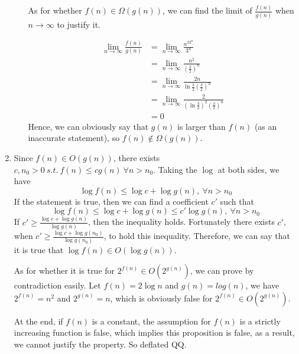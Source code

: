 \documentclass[a4paper,12pt]{article}
\begin{document}
\begin{enumerate}
\begin{enumerate}
{As for whether $f(n) \in \Omega (g(n))$, we can find the limit of $\frac{f(n)}{g(n)}$ when $n \rightarrow \infty $ to justify it.

\[
\begin{split}
\lim_{n \rightarrow \infty} \frac{f(n)}{g(n)} & = \lim_{n \rightarrow \infty} \frac{n^22^n}{3^n} \\
& = \lim_{n \rightarrow \infty} \frac{n^2}{(\frac{3}{2})^n} \\
& = \lim_{n \rightarrow \infty} \frac{2n}{\ln \frac{3}{2} (\frac{3}{2})^n} \\
& = \lim_{n \rightarrow \infty} \frac{2}{(\ln \frac{3}{2})^2 (\frac{3}{2})^n} \\
& = 0
\end{split}
\]
Hence, we can obviously say that $g(n)$ is larger than $f(n)$ (as an inaccurate statement), so $f(n) \notin \Omega (g(n))$.
    }
\end{enumerate}

\item{
Since $f(n) \in O(g(n))$, there exists $c,n_0>0 \ s.t. \ f(n) \leq cg(n) \ \forall n>n_0$. Taking the $\log$ at both sides, we have
\[
\log f(n) \leq \log c + \log g(n), \ \forall n>n_0
\]
If the statement is true, then we can find a coefficient $c'$ such that
\[
\log f(n) \leq \log c + \log g(n) \leq c' \log g(n), \ \forall n>n_0
\]
If $c' \geq \frac{\log c + \log g(n)}{\log g(n)}$, then the inequality holds. Fortunately there exists $c'$, when $c' \geq \frac{\log c + \log g(n_0)}{\log g(n_0)}$, to hold this inequality. Therefore, we can say that it is true that $\log f(n) \in O(\log g(n))$.

As for whether it is true for $2^{f(n)} \in O(2^{g(n)})$, we can prove by contradiction easily. Let $f(n) = 2\log n$ and $g(n) = log(n)$, we have $2^{f(n)}=n^2$ and $2^{g(n)} = n$, which is obviously false for $2^{f(n)} \in O(2^{g(n)})$.

At the end, if $f(n)$ is a constant, the assumption for $f(n)$ is a strictly increasing function is false, which implies this proposition is false, as a result, we cannot justify the property. So deflated QQ.
}


\end{enumerate}
\end{document}
